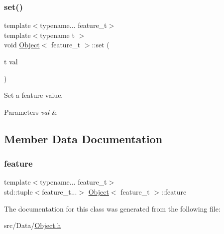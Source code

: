 \mbox{\label{struct_object_a520a6392c6c1acf0a0a53a08b8ffaa7d}} 
\subsubsection{\texorpdfstring{set()}{set()}}
{\footnotesize\ttfamily template$<$typename... feature\+\_\+t$>$ \\
template$<$typename t $>$ \\
void \hyperlink{struct_object}{Object}$<$ feature\+\_\+t $>$\+::set (\begin{DoxyParamCaption}\item[{t}]{val }\end{DoxyParamCaption})\hspace{0.3cm}{\ttfamily [inline]}}



Set a feature value. 


\begin{DoxyParams}{Parameters}
{\em val} & \\
\hline
\end{DoxyParams}


\subsection{Member Data Documentation}
\mbox{\label{struct_object_a13175d047537123b71456580cae61dee}} 
\subsubsection{\texorpdfstring{feature}{feature}}
{\footnotesize\ttfamily template$<$typename... feature\+\_\+t$>$ \\
std\+::tuple$<$feature\+\_\+t...$>$ \hyperlink{struct_object}{Object}$<$ feature\+\_\+t $>$\+::feature}



The documentation for this class was generated from the following file\+:\begin{DoxyCompactItemize}
\item 
src/\+Data/\hyperlink{_object_8h}{Object.\+h}\end{DoxyCompactItemize}
